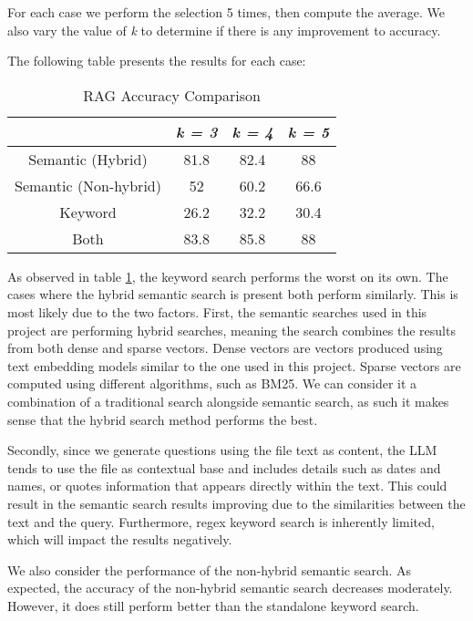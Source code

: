 For each case we perform the selection 5 times, then compute the average. We also vary the value of \textit{k} to determine if there is any improvement to accuracy.

The following table presents the results for each case:

\begin{table}
	\centering
	\begin{tabular}{|c|c|c|c|}
		\hline
		                  & \textit{k = 3} & \textit{k = 4} & \textit{k = 5} \\
		\hline
		Semantic (Hybrid) & 81.8           & 82.4           & 88             \\
        \hline
		Semantic (Non-hybrid) & 52             & 60.2           & 66.6           \\
		\hline
		Keyword           & 26.2           & 32.2           & 30.4           \\
		\hline
		Both              & 83.8           & 85.8           & 88             \\
		\hline
	\end{tabular}
	\caption{RAG Accuracy Comparison}
	\label{Tab:RAGAccuracyComp}
\end{table}


As observed in table \ref{Tab:RAGAccuracyComp}, the keyword search performs the worst on its own. The cases where the hybrid semantic search is present both perform similarly. This is most likely due to the two factors. First, the semantic searches used in this project are performing hybrid searches, meaning the search combines the results from both dense and sparse vectors. Dense vectors are vectors produced using text embedding models similar to the one used in this project. Sparse vectors are computed using different algorithms, such as BM25. We can consider it a combination of a traditional search alongside semantic search, as such it makes sense that the hybrid search method performs the best.

Secondly, since we generate questions using the file text as content, the LLM tends to use the file as contextual base and includes details such as dates and names, or quotes information that appears directly within the text. This could result in the semantic search results improving due to the similarities between the text and the query. Furthermore, regex keyword search is inherently limited, which will impact the results negatively.

We also consider the performance of the non-hybrid semantic search. As expected, the accuracy of the non-hybrid semantic search decreases moderately. However, it does still perform better than the standalone keyword search.

